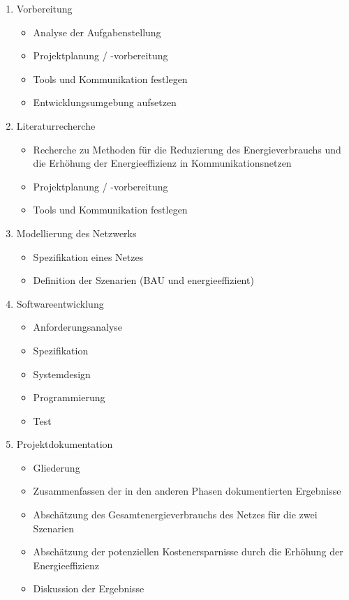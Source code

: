 \begin{enumerate}
\item Vorbereitung
\begin{itemize}
\item Analyse der Aufgabenstellung
\item Projektplanung / -vorbereitung
\item Tools und Kommunikation festlegen
\item Entwicklungsumgebung aufsetzen
\end{itemize}

\item Literaturrecherche
\begin{itemize}
\item Recherche zu Methoden für die Reduzierung des Energieverbrauchs und die Erhöhung der Energieeffizienz in Kommunikationsnetzen
\item Projektplanung / -vorbereitung
\item Tools und Kommunikation festlegen
\end{itemize}

\item Modellierung des Netzwerks
\begin{itemize}
\item Spezifikation eines Netzes
\item Definition der Szenarien (BAU und energieeffizient)
\end{itemize}

\item Softwareentwicklung
\begin{itemize}
\item Anforderungsanalyse
\item Spezifikation
\item Systemdesign
\item Programmierung
\item Test
\end{itemize}

\item Projektdokumentation
\begin{itemize}
\item Gliederung
\item Zusammenfassen der in den anderen Phasen dokumentierten Ergebnisse
\item Abschätzung des Gesamtenergieverbrauchs des Netzes für die zwei Szenarien
\item Abschätzung der potenziellen Kostenersparnisse durch die Erhöhung der Energieeffizienz
\item Diskussion der Ergebnisse
\end{itemize}


\end{enumerate}
